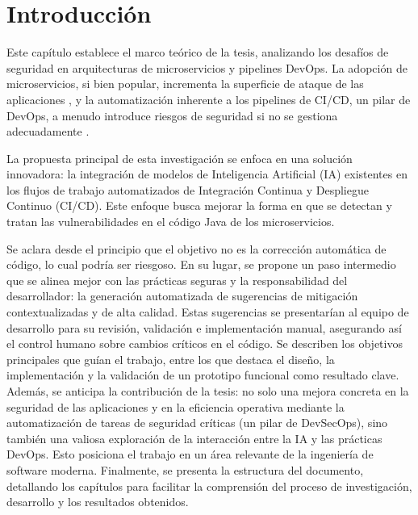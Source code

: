 \chapter{Introducción}\label{chap:introduccion}
Este capítulo establece el marco teórico de la tesis, analizando los desafíos de seguridad en arquitecturas de microservicios y pipelines DevOps. La adopción de microservicios, si bien popular, incrementa la superficie de ataque de las aplicaciones \cite{Zafeiropoulos2023SecurityGaps}, y la automatización inherente a los pipelines de CI/CD, un pilar de DevOps, a menudo introduce riesgos de seguridad si no se gestiona adecuadamente \cite{NIST2024CICDSecurity}.

La propuesta principal de esta investigación se enfoca en una solución innovadora: la integración de modelos de Inteligencia Artificial (IA) existentes en los flujos de trabajo automatizados de Integración Continua y Despliegue Continuo (CI/CD). Este enfoque busca mejorar la forma en que se detectan y tratan las vulnerabilidades en el código Java de los microservicios.

Se aclara desde el principio que el objetivo no es la corrección automática de código, lo cual podría ser riesgoso. En su lugar, se propone un paso intermedio que se alinea mejor con las prácticas seguras y la responsabilidad del desarrollador: la generación automatizada de sugerencias de mitigación contextualizadas y de alta calidad. Estas sugerencias se presentarían al equipo de desarrollo para su revisión, validación e implementación manual, asegurando así el control humano sobre cambios críticos en el código. Se describen los objetivos principales que guían el trabajo, entre los que destaca el diseño, la implementación y la validación de un prototipo funcional como resultado clave. Además, se anticipa la contribución de la tesis: no solo una mejora concreta en la seguridad de las aplicaciones y en la eficiencia operativa mediante la automatización de tareas de seguridad críticas (un pilar de DevSecOps), sino también una valiosa exploración de la interacción entre la IA y las prácticas DevOps. Esto posiciona el trabajo en un área relevante de la ingeniería de software moderna. Finalmente, se presenta la estructura del documento, detallando los capítulos para facilitar la comprensión del proceso de investigación, desarrollo y los resultados obtenidos.

